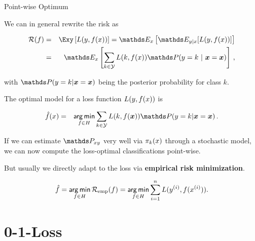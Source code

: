 \begin{vbframe}{Point-wise Optimum}


We can in general rewrite the risk as

\vspace*{-0.5cm}

\begin{eqnarray*}
  \riskf  & = & \Exy\left[\Lxy\right] = \E_x \left[ \E_{y|x} [ L(y, \fx) ] \right] \\
          & = & \E_x \left[\sum_{k \in \Yspace} L(k, \fx) \P(y = k~|~ \xv = \xv)\right]\,, \\
\end{eqnarray*}

with $\P(y = k| \xv = \xv)$ being the posterior probability for class $k$.

\lz 

The optimal model for a loss function $L(y, f(x))$ is

\begin{eqnarray*}
  \fxh &=& \argmin_{f \in \Hspace} \sum_{k \in \Yspace} L(k, f(\bm{x})) \P(y = k| \xv = \xv)\,.  \\
\end{eqnarray*}

If we can estimate $\Pxy$ very well via $\pi_k(x)$ through a stochastic model, we can now compute the loss-optimal classifications point-wise. 

But usually we directly adapt to the loss via \textbf{empirical risk minimization}. 

$$
\hat{f} = \mathop{\sf arg\,min}_{f \in H} \mathcal{R}_{\text{emp}}(f) = \mathop{\sf arg\,min}_{f \in H} \sum_{i=1}^n L(y^{(i)}, f(x^{(i)})).
$$
  

\end{vbframe}


\section{0-1-Loss}



